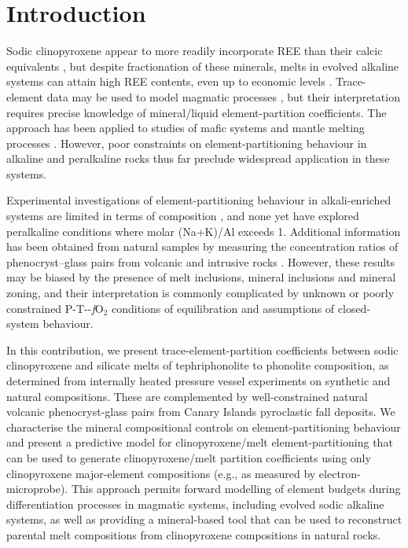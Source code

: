 \documentclass[review,authoryear,12pt]{elsarticle}
\newcommand{\fO}{\textit{f}O$_{2}$ }
\begin{document}
\section{Introduction}
Sodic clinopyroxene appear to more readily incorporate REE than their calcic equivalents \citep{Marks2004}, but despite fractionation of these minerals, melts in evolved alkaline systems can attain high REE contents, even up to economic levels \citep{Kogarko1990,Downes2005,Marks2011,Sjoqvist2013,Goodenough2016,Moller2016}. Trace-element data may be used to model magmatic processes \citep{Spera2001, Troll2002, Boudreau2004,Xu2010,Girnis2013,Mungall2014}, but their interpretation requires precise knowledge of mineral/liquid element-partition coefficients. The approach has been applied to studies of mafic systems and mantle melting processes \citep[][]{Niu2004, Workman2005, Foley2013, Coumans2016, Peters2017}. However, poor constraints on element-partitioning behaviour in alkaline and peralkaline rocks thus far preclude widespread application in these systems.

Experimental investigations of element-partitioning behaviour in alkali-enriched systems are limited in terms of composition \citep{Wood2001cpx, Huang2006}, and none yet have explored peralkaline conditions where molar (Na+K)/Al exceeds 1. Additional information has been obtained from natural samples by measuring the concentration ratios of phenocryst--glass pairs from volcanic and intrusive rocks \citep{Larsen1979, Worner1983, Shearer1994, Severs2009, Fedele2009, Mollo2016}. However, these results may be biased by the presence of melt inclusions, mineral inclusions and mineral zoning, and their interpretation is commonly complicated by unknown or poorly constrained P-T--\fO conditions of equilibration and assumptions of closed-system behaviour.

In this contribution, we present trace-element-partition coefficients between sodic clinopyroxene and silicate melts of tephriphonolite to phonolite composition, as determined from internally heated pressure vessel experiments on synthetic and natural compositions. These are complemented by well-constrained natural volcanic phenocryst-glass pairs from Canary Islands pyroclastic fall deposits.
We characterise the mineral compositional controls on element-partitioning behaviour and present a predictive model for clinopyroxene/melt element-partitioning that can be used to generate clinopyroxene/melt partition coefficients using only clinopyroxene major-element compositions (e.g., as measured by electron-microprobe). This approach permits forward modelling of element budgets during differentiation processes in magmatic systems, including evolved sodic alkaline systems, as well as providing a mineral-based tool that can be used to reconstruct parental melt compositions from clinopyroxene compositions in natural rocks.
\end{document}
